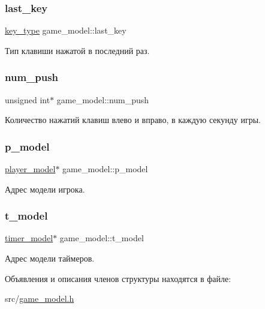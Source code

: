 \subsubsection{\texorpdfstring{last\+\_\+key}{last\_key}}
{\footnotesize\ttfamily \hyperlink{game__model_8h_ab56b05c2bb34d1168dc2576c83a1e287}{key\+\_\+type} game\+\_\+model\+::last\+\_\+key}



Тип клавиши нажатой в последний раз. 

\mbox{\label{structgame__model_abf2236d6bb182f60659d811a096ba0b3}} 
\subsubsection{\texorpdfstring{num\+\_\+push}{num\_push}}
{\footnotesize\ttfamily unsigned int$\ast$ game\+\_\+model\+::num\+\_\+push}



Количество нажатий клавиш влево и вправо, в каждую секунду игры. 

\mbox{\label{structgame__model_a3bcbf217f1b8c8f3e2407b852da268ed}} 
\subsubsection{\texorpdfstring{p\+\_\+model}{p\_model}}
{\footnotesize\ttfamily \hyperlink{structplayer__model}{player\+\_\+model}$\ast$ game\+\_\+model\+::p\+\_\+model}



Адрес модели игрока. 

\mbox{\label{structgame__model_aadcf1b0427739bb95070a015c4b43988}} 
\subsubsection{\texorpdfstring{t\+\_\+model}{t\_model}}
{\footnotesize\ttfamily \hyperlink{structtimer__model}{timer\+\_\+model}$\ast$ game\+\_\+model\+::t\+\_\+model}



Адрес модели таймеров. 



Объявления и описания членов структуры находятся в файле\+:\begin{DoxyCompactItemize}
\item 
src/\hyperlink{game__model_8h}{game\+\_\+model.\+h}\end{DoxyCompactItemize}
